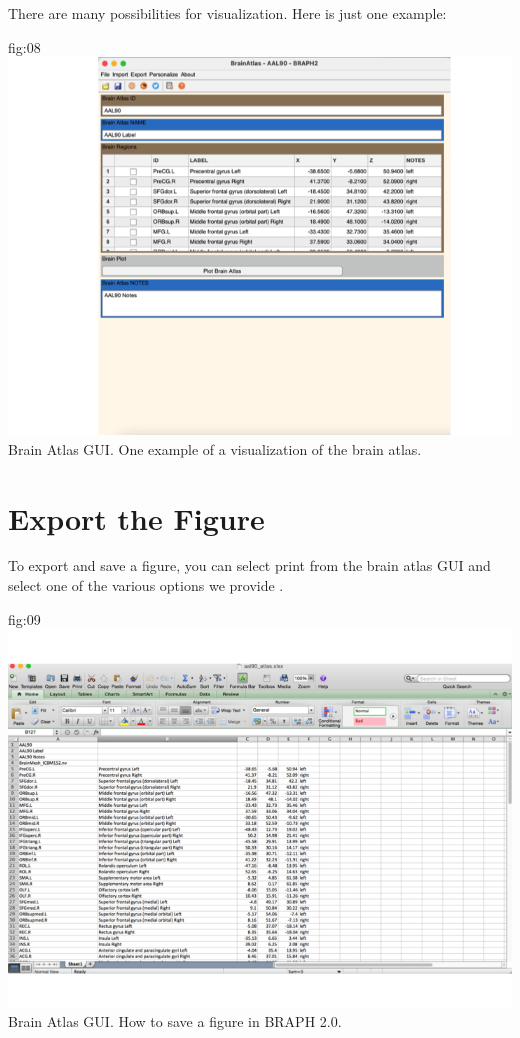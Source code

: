 \documentclass{tufte-handout}
\begin{document}
There are many possibilities for visualization. Here is just one example:

	{fig:08}
	{\includegraphics[height=10cm]{tut_ba/fig8.png}}
	{Brain Atlas GUI.}
	{
	One example of a visualization of the brain atlas. 
	}

\clearpage
\section{Export the Figure}

To export and save a figure, you can select print from the brain atlas GUI and select one of the various options we provide .

	{fig:09}
	{\includegraphics[height=10cm]{tut_ba/fig9.png}}
	{Brain Atlas GUI.}
	{
	How to save a figure in BRAPH 2.0. 
	}
\end{document}
